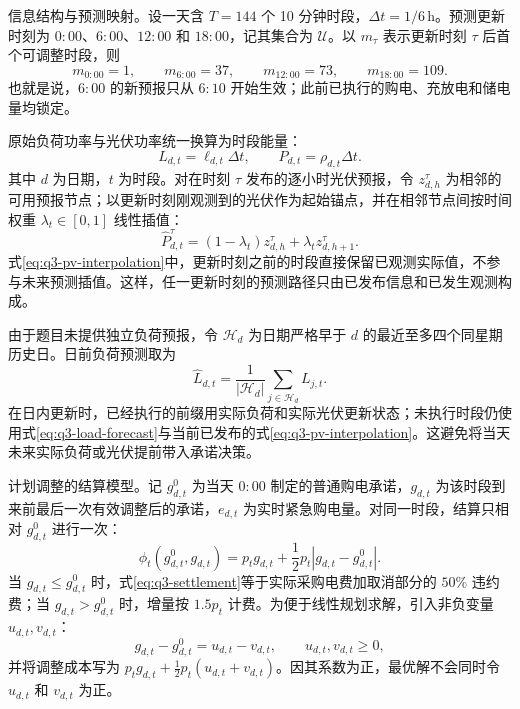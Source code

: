 \noindent 信息结构与预测映射。设一天含 $T=144$ 个 10 分钟时段，$\Delta t=1/6\,\mathrm{h}$。预测更新时刻为 $0{:}00$、$6{:}00$、$12{:}00$ 和 $18{:}00$，记其集合为 $\mathcal U$。以 $m_\tau$ 表示更新时刻 $\tau$ 后首个可调整时段，则
\begin{equation}
m_{0{:}00}=1,\qquad m_{6{:}00}=37,\qquad m_{12{:}00}=73,\qquad m_{18{:}00}=109.
\label{eq:q3-first-mutable}
\end{equation}
也就是说，$6{:}00$ 的新预报只从 $6{:}10$ 开始生效；此前已执行的购电、充放电和储电量均锁定。

原始负荷功率与光伏功率统一换算为时段能量：
\begin{equation}
L_{d,t}=\ell_{d,t}\Delta t,\qquad P_{d,t}=\rho_{d,t}\Delta t.
\label{eq:q3-energy-conversion}
\end{equation}
其中 $d$ 为日期，$t$ 为时段。对在时刻 $\tau$ 发布的逐小时光伏预报，令 $z_{d,h}^{\tau}$ 为相邻的可用预报节点；以更新时刻刚观测到的光伏作为起始锚点，并在相邻节点间按时间权重 $\lambda_t\in[0,1]$ 线性插值：
\begin{equation}
\widehat P_{d,t}^{\tau}=(1-\lambda_t)z_{d,h}^{\tau}+\lambda_t z_{d,h+1}^{\tau}.
\label{eq:q3-pv-interpolation}
\end{equation}
式\eqref{eq:q3-pv-interpolation}中，更新时刻之前的时段直接保留已观测实际值，不参与未来预测插值。这样，任一更新时刻的预测路径只由已发布信息和已发生观测构成。

由于题目未提供独立负荷预报，令 $\mathcal H_d$ 为日期严格早于 $d$ 的最近至多四个同星期历史日。日前负荷预测取为
\begin{equation}
\widehat L_{d,t}=\frac{1}{|\mathcal H_d|}\sum_{j\in\mathcal H_d}L_{j,t}.
\label{eq:q3-load-forecast}
\end{equation}
在日内更新时，已经执行的前缀用实际负荷和实际光伏更新状态；未执行时段仍使用式\eqref{eq:q3-load-forecast}与当前已发布的式\eqref{eq:q3-pv-interpolation}。这避免将当天未来实际负荷或光伏提前带入承诺决策。

\noindent 计划调整的结算模型。记 $g_{d,t}^{0}$ 为当天 $0{:}00$ 制定的普通购电承诺，$g_{d,t}$ 为该时段到来前最后一次有效调整后的承诺，$e_{d,t}$ 为实时紧急购电量。对同一时段，结算只相对 $g_{d,t}^{0}$ 进行一次：
\begin{equation}
\phi_t\left(g_{d,t}^{0},g_{d,t}\right)=p_tg_{d,t}+\frac{1}{2}p_t\left|g_{d,t}-g_{d,t}^{0}\right|.
\label{eq:q3-settlement}
\end{equation}
当 $g_{d,t}\leq g_{d,t}^{0}$ 时，式\eqref{eq:q3-settlement}等于实际采购电费加取消部分的 $50\%$ 违约费；当 $g_{d,t}>g_{d,t}^{0}$ 时，增量按 $1.5p_t$ 计费。为便于线性规划求解，引入非负变量 $u_{d,t},v_{d,t}$：
\begin{equation}
g_{d,t}-g_{d,t}^{0}=u_{d,t}-v_{d,t},\qquad u_{d,t},v_{d,t}\geq0,
\label{eq:q3-adjust-linearization}
\end{equation}
并将调整成本写为 $p_tg_{d,t}+\tfrac12p_t(u_{d,t}+v_{d,t})$。因其系数为正，最优解不会同时令 $u_{d,t}$ 和 $v_{d,t}$ 为正。

